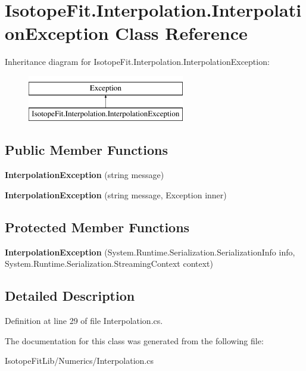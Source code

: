 \hypertarget{class_isotope_fit_1_1_interpolation_1_1_interpolation_exception}{}\section{Isotope\+Fit.\+Interpolation.\+Interpolation\+Exception Class Reference}
\label{class_isotope_fit_1_1_interpolation_1_1_interpolation_exception}
Inheritance diagram for Isotope\+Fit.\+Interpolation.\+Interpolation\+Exception\+:\begin{figure}[H]
\begin{center}
\leavevmode
\includegraphics[height=2.000000cm]{class_isotope_fit_1_1_interpolation_1_1_interpolation_exception}
\end{center}
\end{figure}
\subsection*{Public Member Functions}
\begin{DoxyCompactItemize}
\item 
\mbox{\label{class_isotope_fit_1_1_interpolation_1_1_interpolation_exception_a9e94ab620a10ae4086570d04c3487bca}} 
{\bfseries Interpolation\+Exception} (string message)
\item 
\mbox{\label{class_isotope_fit_1_1_interpolation_1_1_interpolation_exception_aa3d1266e6b875169acec315c043c5d50}} 
{\bfseries Interpolation\+Exception} (string message, Exception inner)
\end{DoxyCompactItemize}
\subsection*{Protected Member Functions}
\begin{DoxyCompactItemize}
\item 
\mbox{\label{class_isotope_fit_1_1_interpolation_1_1_interpolation_exception_a1580559b679fda8e19fa66cad9886440}} 
{\bfseries Interpolation\+Exception} (System.\+Runtime.\+Serialization.\+Serialization\+Info info, System.\+Runtime.\+Serialization.\+Streaming\+Context context)
\end{DoxyCompactItemize}


\subsection{Detailed Description}


Definition at line 29 of file Interpolation.\+cs.



The documentation for this class was generated from the following file\+:\begin{DoxyCompactItemize}
\item 
Isotope\+Fit\+Lib/\+Numerics/Interpolation.\+cs\end{DoxyCompactItemize}
